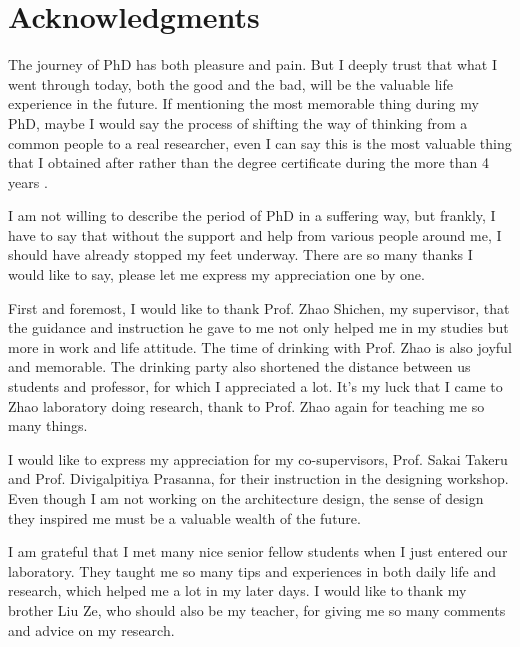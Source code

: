 \documentclass[12pt, twoside, a4paper]{book} %
\renewcommand{\baselinestretch}{1.5} %
\begin{document}
\frontmatter

\renewcommand{\baselinestretch}{1.5} %
\fontsize{13pt}{13pt} %
\selectfont

\chapter{Acknowledgments}
The journey of PhD has both pleasure and pain. But I deeply trust that what I went through today, both the good and the bad, will be the valuable life experience in the future. If mentioning the most memorable thing during my PhD, maybe I would say the process of shifting the way of thinking from a common people to a real researcher, even I can say this is the most valuable thing that I obtained after rather than the degree certificate during the more than 4 years .

I am not willing to describe the period of PhD in a suffering way, but frankly, I have to say that without the support and help from various people around me, I should have already stopped my feet underway. There are so many thanks I would like to say, please let me express my appreciation one by one.

First and foremost, I would like to thank Prof. Zhao Shichen, my supervisor, that the guidance and instruction he gave to me not only helped me in my studies but more in work and life attitude. The time of drinking with Prof. Zhao is also joyful and memorable. The drinking party also shortened the distance between us students and professor, for which I appreciated a lot. It's my luck that I came to Zhao laboratory doing research, thank to Prof. Zhao again for teaching me so many things.

I would like to express my appreciation for my co-supervisors, Prof. Sakai Takeru and Prof. Divigalpitiya Prasanna, for their instruction in the designing workshop. Even though I am not working on the architecture design, the sense of design they inspired me must be a valuable wealth of the future.

I am grateful that I met many nice senior fellow students when I just entered our laboratory. They taught me so many tips and experiences in both daily life and research, which helped me a lot in my later days. I would like to thank my brother Liu Ze, who should also be my teacher, for giving me so many comments and advice on my research. 
\end{document}
